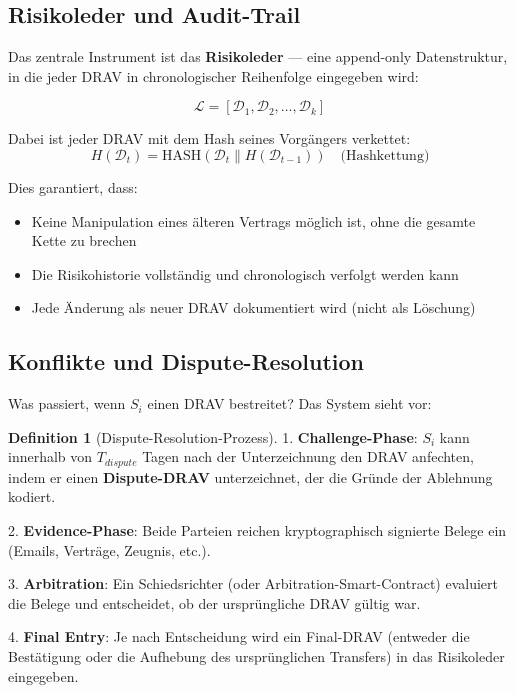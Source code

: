 \documentclass[a4paper,12pt]{article}
\theoremstyle{definition}
\newtheorem{definition}{Definition}
\begin{document}
\subsection{Risikoleder und Audit-Trail}

Das zentrale Instrument ist das \textbf{Risikoleder} --- eine append-only Datenstruktur, in die jeder DRAV in chronologischer Reihenfolge eingegeben wird:

\begin{equation}
\mathcal{L} = [\mathcal{D}_1, \mathcal{D}_2, \ldots, \mathcal{D}_k]
\end{equation}

Dabei ist jeder DRAV mit dem Hash seines Vorgängers verkettet:
\begin{equation}
H(\mathcal{D}_t) = \text{HASH}(\mathcal{D}_t \| H(\mathcal{D}_{t-1})) \quad \text{(Hashkettung)}
\end{equation}

Dies garantiert, dass:
\begin{itemize}
    \item Keine Manipulation eines älteren Vertrags möglich ist, ohne die gesamte Kette zu brechen
    \item Die Risikohistorie vollständig und chronologisch verfolgt werden kann
    \item Jede Änderung als neuer DRAV dokumentiert wird (nicht als Löschung)
\end{itemize}

\subsection{Konflikte und Dispute-Resolution}

Was passiert, wenn $S_i$ einen DRAV bestreitet? Das System sieht vor:

\begin{definition}[Dispute-Resolution-Prozess]
1. \textbf{Challenge-Phase}: $S_i$ kann innerhalb von $T_{dispute}$ Tagen nach der Unterzeichnung den DRAV anfechten, indem er einen \textbf{Dispute-DRAV} unterzeichnet, der die Gründe der Ablehnung kodiert.

2. \textbf{Evidence-Phase}: Beide Parteien reichen kryptographisch signierte Belege ein (Emails, Verträge, Zeugnis, etc.).

3. \textbf{Arbitration}: Ein Schiedsrichter (oder Arbitration-Smart-Contract) evaluiert die Belege und entscheidet, ob der ursprüngliche DRAV gültig war.

4. \textbf{Final Entry}: Je nach Entscheidung wird ein Final-DRAV (entweder die Bestätigung oder die Aufhebung des ursprünglichen Transfers) in das Risikoleder eingegeben.
\end{definition}
\end{document}
